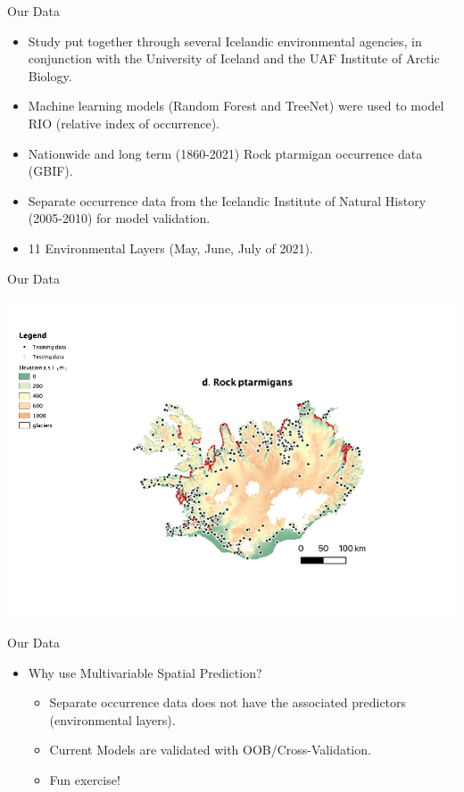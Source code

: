 \documentclass[10pt]{beamer}
\begin{document}
\begin{frame}{Our Data}
    \begin{itemize}
        \item Study put together through several Icelandic environmental agencies, in conjunction with the University of Iceland and the UAF Institute of 
        Arctic Biology. 
        \vfill
        \item Machine learning models (Random Forest and TreeNet) were used to model RIO (relative index of occurrence). 
        \vfill
        \item Nationwide and long term (1860-2021) Rock ptarmigan occurrence data (GBIF). 
        \vfill
        \item Separate occurrence data from the Icelandic Institute of Natural History (2005-2010) for model validation.
         \vfill
        \item 11 Environmental Layers (May, June, July of 2021).
    \end{itemize}
\end{frame}


\begin{frame}{Our Data}
    \begin{center}
        \includegraphics[width = \textwidth]{RockPtarmigan.png}
    \end{center}
\end{frame}

\begin{frame}{Our Data}
    \begin{itemize}
        \item Why use Multivariable Spatial Prediction?
    \begin{itemize}
        \item Separate occurrence data does not have the associated predictors (environmental layers).
        \item Current Models are validated with OOB/Cross-Validation.
        \item Fun exercise!
    \end{itemize}
\end{itemize}
\end{frame}
\end{document}

